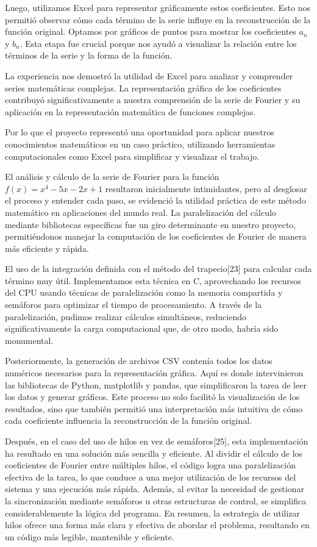Luego, utilizamos Excel para representar gráficamente estos coeficientes. Esto nos permitió observar cómo cada término de la serie influye en la reconstrucción de la función original. Optamos por gráficos de puntos para mostrar los coeficientes \(a_n\) y \(b_n\). Esta etapa fue crucial porque nos ayudó a visualizar la relación entre los términos de la serie y la forma de la función.

La experiencia nos demostró la utilidad de Excel para analizar y comprender series matemáticas complejas. La representación gráfica de los coeficientes contribuyó significativamente a nuestra comprensión de la serie de Fourier y su aplicación en la representación matemática de funciones complejas.

Por lo que el proyecto representó una oportunidad para aplicar nuestros conocimientos matemáticos en un caso práctico, utilizando herramientas computacionales como Excel para simplificar y visualizar el trabajo.

El análisis y cálculo de la serie de Fourier para la función \(f(x)=x^4-5x-2x+1\) resultaron inicialmente intimidantes, pero al desglosar el proceso y entender cada paso, se evidenció la utilidad práctica de este método matemático en aplicaciones del mundo real. La paralelización del cálculo mediante bibliotecas específicas fue un giro determinante en nuestro proyecto, permitiéndonos manejar la computación de los coeficientes de Fourier de manera más eficiente y rápida.

El uso de la integración definida con el método del trapecio{[}23{]} para calcular cada término muy útil. Implementamos esta técnica en C, aprovechando los recursos del CPU usando técnicas de paralelización como la memoria compartida y semáforos para optimizar el tiempo de procesamiento. A través de la paralelización, pudimos realizar cálculos simultáneos, reduciendo significativamente la carga computacional que, de otro modo, habría sido monumental.

Posteriormente, la generación de archivos CSV contenía todos los datos numéricos necesarios para la representación gráfica. Aquí es donde intervinieron las bibliotecas de Python, matplotlib y pandas, que simplificaron la tarea de leer los datos y generar gráficos. Este proceso no solo facilitó la visualización de los resultados, sino que también permitió una interpretación más intuitiva de cómo cada coeficiente influencia la reconstrucción de la función original.

Después, en el caso del uso de hilos en vez de semáforos{[}25{]}, esta implementación ha resultado en una solución más sencilla y eficiente. Al dividir el cálculo de los coeficientes de Fourier entre múltiples hilos, el código logra una paralelización efectiva de la tarea, lo que conduce a una mejor utilización de los recursos del sistema y una ejecución más rápida. Además, al evitar la necesidad de gestionar la sincronización mediante semáforos u otras estructuras de control, se simplifica considerablemente la lógica del programa. En resumen, la estrategia de utilizar hilos ofrece una forma más clara y efectiva de abordar el problema, resultando en un código más legible, mantenible y eficiente.

